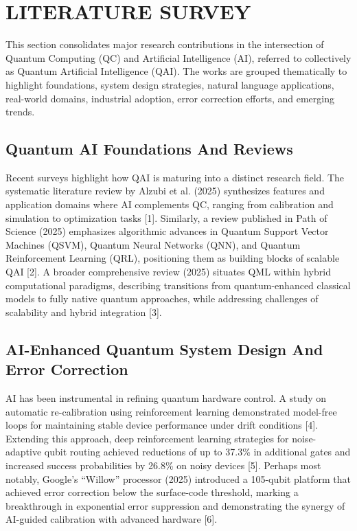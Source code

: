 \chapter{LITERATURE SURVEY	}
\hspace*{0.3in}This section consolidates major research contributions in the intersection of Quantum Computing (QC) and Artificial Intelligence (AI), referred to collectively as Quantum Artificial Intelligence (QAI). The works are grouped thematically to highlight foundations, system design strategies, natural language applications, real-world domains, industrial adoption, error correction efforts, and emerging trends.
\section{Quantum AI Foundations And Reviews}
\hspace*{0.3in}Recent surveys highlight how QAI is maturing into a distinct research field. The systematic literature review by Alzubi et al. (2025) synthesizes features and application domains where AI complements QC, ranging from calibration and simulation to optimization tasks [1]. Similarly, a review published in Path of Science (2025) emphasizes algorithmic advances in Quantum Support Vector Machines (QSVM), Quantum Neural Networks (QNN), and Quantum Reinforcement Learning (QRL), positioning them as building blocks of scalable QAI [2]. A broader comprehensive review (2025) situates QML within hybrid computational paradigms, describing transitions from quantum-enhanced classical models to fully native quantum approaches, while addressing challenges of scalability and hybrid integration [3].

\section{AI-Enhanced Quantum System Design And Error Correction}
\hspace*{0.3in}AI has been instrumental in refining quantum hardware control. A study on automatic re-calibration using reinforcement learning demonstrated model-free loops for maintaining stable device performance under drift conditions [4]. Extending this approach, deep reinforcement learning strategies for noise-adaptive qubit routing achieved reductions of up to 37.3\%
 in additional gates and increased success probabilities by 26.8\%
  on noisy devices [5]. Perhaps most notably, Google’s “Willow” processor (2025) introduced a 105-qubit platform that achieved error correction below the surface-code threshold, marking a breakthrough in exponential error suppression and demonstrating the synergy of AI-guided calibration with advanced hardware [6].
